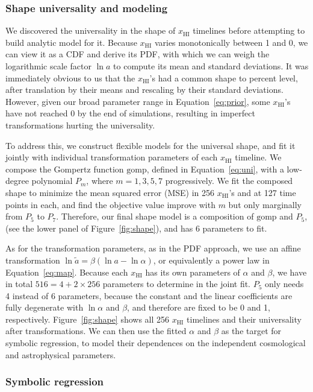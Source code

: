 \documentclass[12pt]{article}
\newcommand{\HI}{\mathrm{HI}}
\newcommand{\ap}{\alpha}
\newcommand{\tilt}{\beta}
\newcommand{\ar}{\tilde{a}}
\newcommand{\gomp}{\mathrm{gomp}}
\begin{document}
\subsubsection*{Shape universality and modeling}
\label{sec:shape}

We discovered the universality in the shape of $x_\HI$ timelines before
attempting to build analytic model for it.
Because $x_\HI$ varies monotonically between 1 and 0, we can view it as
a CDF and derive its PDF, with which we can weigh the logarithmic scale
factor $\ln a$ to compute its mean and standard deviations.
It was immediately obvious to us that the $x_\HI$'s had a common shape
to percent level, after translation by their means and rescaling by
their standard deviations.
However, given our broad parameter range in Equation~\eqref{eq:prior}, some
$x_\HI$'s have not reached 0 by the end of simulations, resulting in
imperfect transformations hurting the universality.

To address this, we construct flexible models for the universal shape,
and fit it jointly with individual transformation parameters of each
$x_\HI$ timeline.
We compose the Gompertz function $\gomp$, defined in Equation~\eqref{eq:uni}, with
a low-degree polynomial $P_m$, where $m = 1, 3, 5, 7$ progressively.
We fit the composed shape to minimize the mean squared error (MSE) in
256 $x_\HI$'s and at 127 time points in each, and find the objective
value improve with $m$ but only marginally from $P_5$ to $P_7$.
Therefore, our final shape model is a composition of $\gomp$ and $P_5$,
(see the lower panel of Figure~\ref{fig:shape}), and has 6 parameters to fit.

As for the transformation parameters, as in the PDF approach, we use an
affine transformation $\ln\ar = \tilt (\ln a - \ln\ap)$, or equivalently
a power law in Equation~\eqref{eq:map}.
Because each $x_\HI$ has its own parameters of $\ap$ and $\tilt$, we
have in total $516 = 4 + 2 \times 256$ parameters to determine in the
joint fit.
$P_5$ only needs 4 instead of 6 parameters, because the constant and the
linear coefficients are fully degenerate with $\ln\ap$ and $\tilt$, and
therefore are fixed to be 0 and 1, respectively.
Figure~\ref{fig:shape} shows all 256 $x_\HI$ timelines and their universality
after transformations.
We can then use the fitted $\ap$ and $\tilt$ as the target for symbolic
regression, to model their dependences on the independent cosmological
and astrophysical parameters.


\subsubsection*{Symbolic regression}
\label{sec:pysr}
\end{document}

